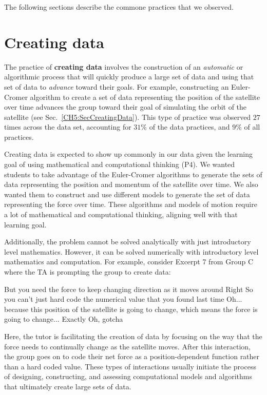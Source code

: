 \documentclass{msuphddissertation}
\begin{document}
\begin{doublespace}
\begin{appendices}
The following sections describe the commone practices that we observed.

\section*{Creating data}

The practice of \textbf{creating data} involves the construction of an \textit{automatic} or algorithmic process that will quickly produce a large set of data and using that set of data to \textit{advance} toward their goals.  For example, constructing an Euler-Cromer algorithm to create a set of data representing the position of the satellite over time advances the group toward their goal of simulating the orbit of the satellite (see Sec.~\ref{CH5:SecCreatingData}).  This type of practice was observed $27$ times across the data set, accounting for $31\%$ of the data practices, and $9\%$ of all practices.

Creating data is expected to show up commonly in our data given the learning goal of using mathematical and computational thinking (P4).  We wanted students to take advantage of the Euler-Cromer algorithms to generate the sets of data representing the position and momentum of the satellite over time.  We also wanted them to construct and use different models to generate the set of data representing the force over time.  These algorithms and models of motion require a lot of mathematical and computational thinking, aligning well with that learning goal.

Additionally, the problem cannot be solved analytically with just introductory level mathematics.  However, it can be solved numerically with introductory level mathematics and computation.  For example, consider Excerpt 7 from Group C where the TA is prompting the group to create data: \begin{description}
\TA But you need the force to keep changing direction as it moves around
\SC Right
\TA So you can't just hard code the numerical value that you found last time
\SC Oh... because this {position of the satellite} is going to change, which means the force is going to change...
\TA Exactly
\SB Oh, gotcha
\end{description}  Here, the tutor is facilitating the creation of data by focusing on the way that the force needs to continually change as the satellite moves.  After this interaction, the group goes on to code their net force as a position-dependent function rather than a hard coded value.  These types of interactions usually initiate the process of designing, constructing, and assessing computational models and algorithms that ultimately create large sets of data.


\end{appendices}
\end{doublespace}
\end{document}
